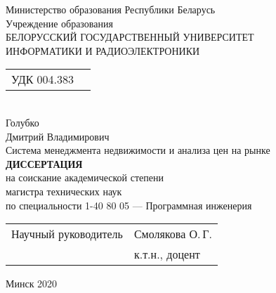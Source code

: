 \begin{titlepage}
  \begin{center}
    Министерство образования Республики Беларусь\\[1em]
    Учреждение образования\\
    БЕЛОРУССКИЙ ГОСУДАРСТВЕННЫЙ УНИВЕРСИТЕТ \\
    ИНФОРМАТИКИ И РАДИОЭЛЕКТРОНИКИ\\[3em]

    \begin{tabular}{ p{}p{} }
      УДК 004.383 & \\
    \end{tabular}\\[5em]


    {Голубко}\\
    {Дмитрий Владимирович}\\[1em]

    {Система менеджмента недвижимости и анализа цен на рынке}\\[5em]

    \textbf{ДИССЕРТАЦИЯ}\\
    {на соискание академической степени}\\
    {магистра технических наук}\\[1em]

    {по специальности 1-40 80 05 — Программная инженерия}\\[8em]

    \begin{tabular}{ p{}p{} }
      Научный руководитель & Смолякова О.\,Г. \\
       & к.т.н., доцент\\
    \end{tabular}
    
    \vfill
    {\normalsize Минск 2020}
  \end{center}
\end{titlepage}
